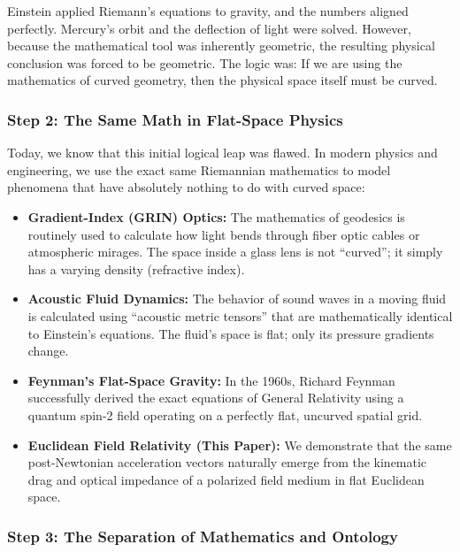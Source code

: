 \documentclass[twocolumn]{article}
\providecommand{\tightlist}{%
  \setlength{\itemsep}{0pt}\setlength{\parskip}{0pt}}
\begin{document}
Einstein applied Riemann's equations to gravity, and the numbers aligned
perfectly. Mercury's orbit and the deflection of light were solved.
However, because the mathematical tool was inherently geometric, the
resulting physical conclusion was forced to be geometric. The logic was:
If we are using the mathematics of curved geometry, then the physical
space itself must be curved.

\subsubsection{Step 2: The Same Math in Flat-Space
Physics}\label{step-2-the-same-math-in-flat-space-physics}

Today, we know that this initial logical leap was flawed. In modern
physics and engineering, we use the exact same Riemannian mathematics to
model phenomena that have absolutely nothing to do with curved space:

\begin{itemize}
\tightlist
\item
  \textbf{Gradient-Index (GRIN) Optics:} The mathematics of geodesics is
  routinely used to calculate how light bends through fiber optic cables
  or atmospheric mirages. The space inside a glass lens is not
  ``curved''; it simply has a varying density (refractive index).
\item
  \textbf{Acoustic Fluid Dynamics:} The behavior of sound waves in a
  moving fluid is calculated using ``acoustic metric tensors'' that are
  mathematically identical to Einstein's equations. The fluid's space is
  flat; only its pressure gradients change.
\item
  \textbf{Feynman's Flat-Space Gravity:} In the 1960s, Richard Feynman
  successfully derived the exact equations of General Relativity using a
  quantum spin-2 field operating on a perfectly flat, uncurved spatial
  grid.
\item
  \textbf{Euclidean Field Relativity (This Paper):} We demonstrate that
  the same post-Newtonian acceleration vectors naturally emerge from the
  kinematic drag and optical impedance of a polarized field medium in
  flat Euclidean space.
\end{itemize}

\subsubsection{Step 3: The Separation of Mathematics and
Ontology}\label{step-3-the-separation-of-mathematics-and-ontology}
\end{document}
